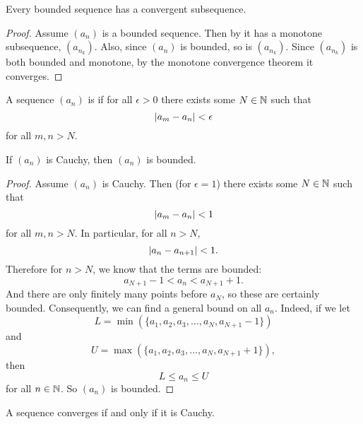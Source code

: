 \begin{theorem}
  Every bounded sequence has a convergent subsequence.
\end{theorem}

\begin{proof}
  Assume $(a_n)$ is a bounded sequence. Then by
   it has a monotone
  subsequence, $(a_{n_k})$. Also, since $(a_n)$ is bounded, so is
  $(a_{n_k})$. Since $(a_{n_k})$ is both bounded and monotone, by the
  monotone convergence theorem it converges.
\end{proof}

\begin{definition}
  A sequence $(a_n)$ is  if for all $\epsilon > 0$
  there exists some $N \in \mathbb N$ such that
  \[ | a_m - a_n | < \epsilon \]
  for all $m, n > N$.
\end{definition}

\begin{lemma}
  If $(a_n)$ is Cauchy, then $(a_n)$ is bounded.
\end{lemma}

\begin{proof}
  Assume $(a_n)$ is Cauchy. Then (for $\epsilon = 1$) there exists
  some $N \in \mathbb N$ such that
  \[ | a_m - a_n | < 1 \]
  for all $m, n > N$. In particular, for all $n > N$,
  \[ | a_n - a_{n+1} | < 1. \]
  Therefore for $n > N$, we know that the terms are bounded:
  \[ a_{N+1} - 1 < a_n < a_{N+1} + 1. \]
  And there are only finitely many points before $a_N$, so these are
  certainly bounded. Consequently, we can find a general bound on all
  $a_n$. Indeed, if we let
  \[ L = \min(\{a_1, a_2, a_3, \dots, a_N, a_{N+1} - 1\}) \]
  and
  \[ U = \max(\{a_1, a_2, a_3, \dots, a_N, a_{N+1} + 1\}), \]
  then
  \[ L \leq a_n \leq U \]
  for all $n \in \mathbb N$. So $(a_n)$ is bounded.
\end{proof}

\begin{theorem}
  A sequence converges if and only if it is Cauchy.
\end{theorem}

